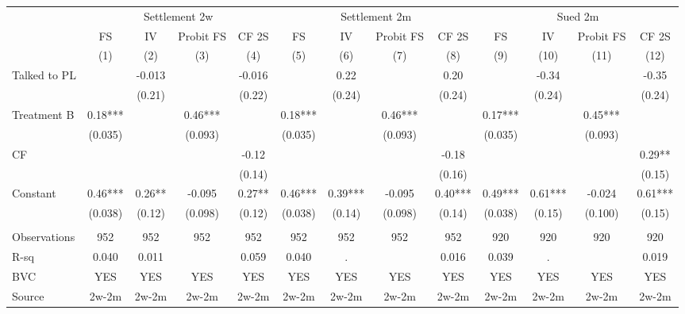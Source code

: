 \begin{tabular}{lcccccccccccc}
\cmidrule{2-13}\multicolumn{1}{r|}{} & \multicolumn{4}{c|}{Settlement 2w} & \multicolumn{4}{c|}{Settlement 2m} & \multicolumn{4}{c|}{Sued 2m} \\
      & FS    & IV    & Probit FS & CF 2S & FS    & IV    & Probit FS & CF 2S & FS    & IV    & Probit FS & CF 2S \\
\midrule
\midrule
      & (1)   & (2)   & (3)   & (4)   & (5)   & (6)   & (7)   & (8)   & (9)   & (10)  & (11)  & (12) \\
\midrule
\midrule
Talked to PL &       & -0.013 &       & -0.016 &       & 0.22  &       & 0.20  &       & -0.34 &       & -0.35 \\
      &       & (0.21) &       & (0.22) &       & (0.24) &       & (0.24) &       & (0.24) &       & (0.24) \\
Treatment B & 0.18*** &       & 0.46*** &       & 0.18*** &       & 0.46*** &       & 0.17*** &       & 0.45*** &  \\
      & (0.035) &       & (0.093) &       & (0.035) &       & (0.093) &       & (0.035) &       & (0.093) &  \\
CF    &       &       &       & -0.12 &       &       &       & -0.18 &       &       &       & 0.29** \\
      &       &       &       & (0.14) &       &       &       & (0.16) &       &       &       & (0.15) \\
Constant  & 0.46*** & 0.26** & -0.095 & 0.27** & 0.46*** & 0.39*** & -0.095 & 0.40*** & 0.49*** & 0.61*** & -0.024 & 0.61*** \\
      & (0.038) & (0.12) & (0.098) & (0.12) & (0.038) & (0.14) & (0.098) & (0.14) & (0.038) & (0.15) & (0.100) & (0.15) \\
      &       &       &       &       &       &       &       &       &       &       &       &  \\
\midrule
Observations & 952   & 952   & 952   & 952   & 952   & 952   & 952   & 952   & 920   & 920   & 920   & 920 \\
R-sq  & 0.040 & 0.011 &       & 0.059 & 0.040 & .     &       & 0.016 & 0.039 & .     &       & 0.019 \\
BVC   & YES   & YES   & YES   & YES   & YES   & YES   & YES   & YES   & YES   & YES   & YES   & YES \\
Source & 2w-2m & 2w-2m & 2w-2m & 2w-2m & 2w-2m & 2w-2m & 2w-2m & 2w-2m & 2w-2m & 2w-2m & 2w-2m & 2w-2m \\
\bottomrule
\bottomrule
\end{tabular}%
